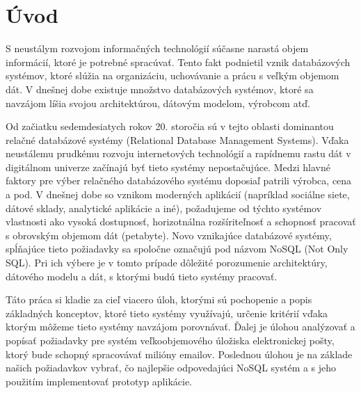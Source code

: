 \documentclass[11pt,twoside,a4paper]{book}
\begin{document}

% 
% 

\chapter{Úvod}
S neustálym rozvojom informačných technológií súčasne narastá objem informácií, ktoré je potrebné spracúvať. Tento fakt podnietil vznik databázových systémov, ktoré slúžia na organizáciu, uchovávanie a prácu s veľkým objemom dát. V dnešnej dobe existuje množstvo databázových systémov, ktoré sa navzájom líšia svojou architektúrou, dátovým modelom, výrobcom atď.

Od začiatku sedemdesiatych rokov 20. storočia sú v tejto oblasti dominantou relačné databázové systémy (Relational Database Management Systems). Vďaka neustálemu prudkému rozvoju internetových technológií a rapídnemu rastu dát v digitálnom univerze \cite{digitalUniverse} začínajú byť tieto systémy nepostačujúce. Medzi hlavné faktory pre výber relačného databázového systému doposiaľ patrili výrobca, cena a pod. V dnešnej dobe so vznikom moderných aplikácií (napríklad sociálne siete, dátové sklady, analytické aplikácie a iné), požadujeme od týchto systémov vlastnosti ako vysoká dostupnosť, horizotnálna rozšíriteľnosť a schopnosť pracovať s obrovským objemom dát (petabyte). Novo vznikajúce databázové systémy, spĺňajúce tieto požiadavky sa spoločne označujú pod názvom NoSQL (Not Only SQL). Pri ich výbere je v tomto prípade dôležité porozumenie architektúry, dátového modelu a dát, s ktorými budú tieto systémy pracovať.

Táto práca si kladie za cieľ viacero úloh, ktorými sú pochopenie a popis základných  konceptov, ktoré tieto systémy využívajú, určenie kritérií vďaka ktorým môžeme tieto systémy navzájom porovnávať. Ďalej je úlohou analýzovať a popísať požiadavky pre systém veľkoobjemového úložiska elektronickej pošty, ktorý bude schopný spracovávať milióny emailov. Poslednou úlohou je na základe našich požiadavkov vybrať, čo najlepšie odpovedajúci NoSQL systém a s jeho použitím implementovať prototyp aplikácie.
\end{document}
